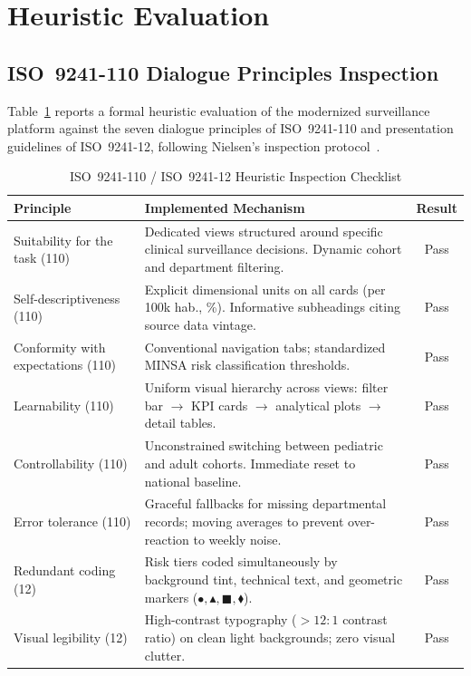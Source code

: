 \documentclass[conference]{IEEEtran}
\begin{document}
\section{Heuristic Evaluation}
\label{sec:evaluation}

\subsection{ISO~9241-110 Dialogue Principles Inspection}

Table~\ref{tab:heuristic} reports a formal heuristic evaluation of the modernized surveillance platform against the seven dialogue principles of ISO~9241-110 and presentation guidelines of ISO~9241-12, following Nielsen's inspection protocol~\cite{Nielsen1993}.

\begin{table}[!t]
\caption{ISO~9241-110 / ISO~9241-12 Heuristic Inspection Checklist}
\label{tab:heuristic}
\centering
\footnotesize
\begin{tabularx}{\columnwidth}{@{}p{2.1cm}Xc@{}}
\toprule
\textbf{Principle} & \textbf{Implemented Mechanism} & \textbf{Result} \\
\midrule
Suitability for the task (110) &
Dedicated views structured around specific clinical surveillance decisions. Dynamic cohort and department filtering. & Pass \\
\addlinespace
Self-descriptiveness (110) &
Explicit dimensional units on all cards (per 100k hab., \%). Informative subheadings citing source data vintage. & Pass \\
\addlinespace
Conformity with expectations (110) &
Conventional navigation tabs; standardized MINSA risk classification thresholds. & Pass \\
\addlinespace
Learnability (110) &
Uniform visual hierarchy across views: filter bar $\to$ KPI cards $\to$ analytical plots $\to$ detail tables. & Pass \\
\addlinespace
Controllability (110) &
Unconstrained switching between pediatric and adult cohorts. Immediate reset to national baseline. & Pass \\
\addlinespace
Error tolerance (110) &
Graceful fallbacks for missing departmental records; moving averages to prevent over-reaction to weekly noise. & Pass \\
\addlinespace
Redundant coding (12) &
Risk tiers coded simultaneously by background tint, technical text, and geometric markers ($\bullet, \blacktriangle, \blacksquare, \blacklozenge$). & Pass \\
\addlinespace
Visual legibility (12) &
High-contrast typography ($>12:1$ contrast ratio) on clean light backgrounds; zero visual clutter. & Pass \\
\bottomrule
\end{tabularx}
\end{table}
\end{document}
